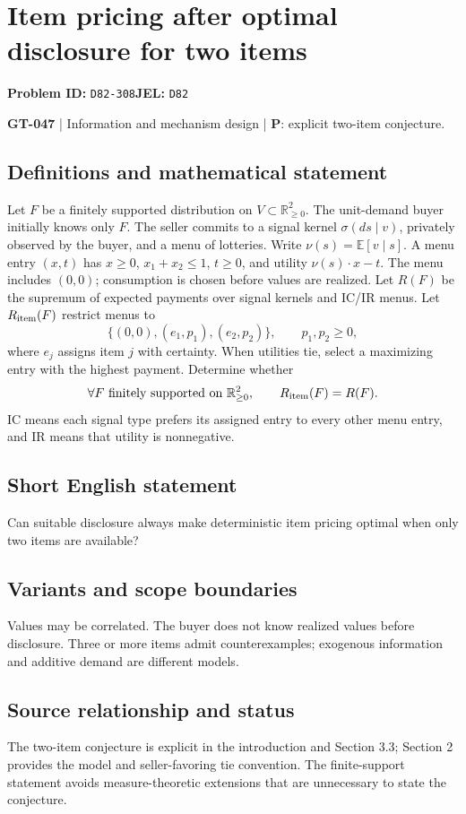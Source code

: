 \documentclass[11pt,a4paper]{article}
\begin{document}
\section*{Item pricing after optimal disclosure for two items}
\textbf{Problem ID:} \texttt{D82-308}\quad \textbf{JEL:} \texttt{D82}\par
\label{problem:OP-0177}
\label{game:GT-047}
{\sffamily\small\color{muted}
\textbf{GT-047} | Information and mechanism design | \textbf{P}: explicit two-item conjecture.
\par}
\subsection*{Definitions and mathematical statement}
Let $F$ be a finitely supported distribution on $V\subset\mathbb R_{\geq0}^2$. The unit-demand buyer initially knows only $F$. The seller commits to a signal kernel $\sigma(ds\mid v)$, privately observed by the buyer, and a menu of lotteries. Write $\nu(s)=\mathbb E[v\mid s]$. A menu entry $(x,t)$ has $x\geq0$, $x_1+x_2\leq1$, $t\geq0$, and utility $\nu(s)\cdot x-t$. The menu includes $(0,0)$; consumption is chosen before values are realized. Let $R(F)$ be the supremum of expected payments over signal kernels and IC/IR menus. Let $R_{\rm item}(F)$ restrict menus to
\[
 \{(0,0),(e_1,p_1),(e_2,p_2)\},\qquad p_1,p_2\geq0,
\]
where $e_j$ assigns item $j$ with certainty. When utilities tie, select a maximizing entry with the highest payment. Determine whether
\[
 \forall F\text{ finitely supported on }\mathbb R_{\geq0}^2,\qquad
 R_{\rm item}(F)=R(F).
\]
IC means each signal type prefers its assigned entry to every other menu entry, and IR means that utility is nonnegative.
\subsection*{Short English statement}
Can suitable disclosure always make deterministic item pricing optimal when only two items are available?
\subsection*{Variants and scope boundaries}
Values may be correlated. The buyer does not know realized values before disclosure. Three or more items admit counterexamples; exogenous information and additive demand are different models.
\subsection*{Source relationship and status}
The two-item conjecture is explicit in the introduction and Section 3.3; Section 2 provides the model and seller-favoring tie convention. The finite-support statement avoids measure-theoretic extensions that are unnecessary to state the conjecture.
\end{document}
